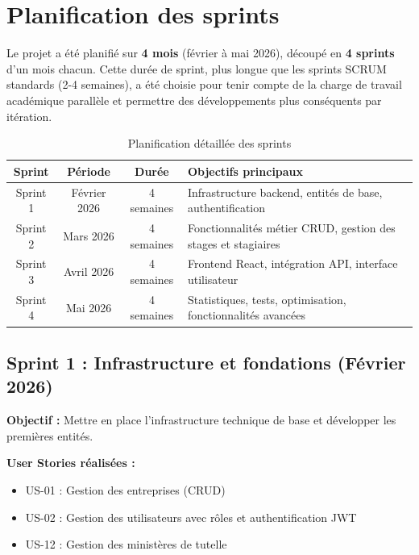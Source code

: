 \documentclass[12pt,a4paper]{report}
\begin{document}
\section{Planification des sprints}

Le projet a été planifié sur \textbf{4 mois} (février à mai 2026), découpé en \textbf{4 sprints} d'un mois chacun. Cette durée de sprint, plus longue que les sprints SCRUM standards (2-4 semaines), a été choisie pour tenir compte de la charge de travail académique parallèle et permettre des développements plus conséquents par itération.

\begin{table}[H]
\centering
\renewcommand{\arraystretch}{1.5}
\begin{tabular}{|c|c|c|p{7cm}|}
\hline
\textbf{Sprint} & \textbf{Période} & \textbf{Durée} & \textbf{Objectifs principaux} \\
\hline
Sprint 1 & Février 2026 & 4 semaines & Infrastructure backend, entités de base, authentification \\
\hline
Sprint 2 & Mars 2026 & 4 semaines & Fonctionnalités métier CRUD, gestion des stages et stagiaires \\
\hline
Sprint 3 & Avril 2026 & 4 semaines & Frontend React, intégration API, interface utilisateur \\
\hline
Sprint 4 & Mai 2026 & 4 semaines & Statistiques, tests, optimisation, fonctionnalités avancées \\
\hline
\end{tabular}
\caption{Planification détaillée des sprints}
\end{table}

\subsection{Sprint 1 : Infrastructure et fondations (Février 2026)}

\textbf{Objectif :} Mettre en place l'infrastructure technique de base et développer les premières entités.

\textbf{User Stories réalisées :}
\begin{itemize}[leftmargin=1cm]
    \item US-01 : Gestion des entreprises (CRUD)
    \item US-02 : Gestion des utilisateurs avec rôles et authentification JWT
    \item US-12 : Gestion des ministères de tutelle
\end{itemize}
\end{document}

